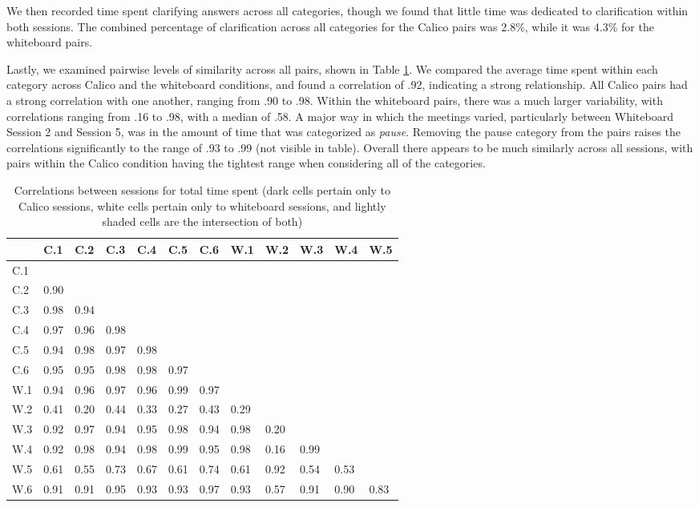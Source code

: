 We then recorded time spent clarifying answers across all categories, though we found that little time was dedicated to clarification within both sessions. The combined percentage of clarification across all categories for the Calico pairs was 2.8\%, while it was 4.3\% for the whiteboard pairs. 

Lastly, we examined pairwise levels of similarity across all pairs, shown in Table \ref{table:3}. We compared the average time spent within each category across Calico and the whiteboard conditions, and found a correlation of .92, indicating a strong relationship. All Calico pairs had a strong correlation with one another, ranging from .90 to .98. Within the whiteboard pairs, there was a much larger variability, with correlations ranging from .16 to .98, with a median of .58. A major way in which the meetings varied, particularly between Whiteboard Session 2 and Session 5, was in the amount of time that was categorized as \emph{pause}. Removing the pause category from the pairs raises the correlations significantly to the range of .93 to .99 (not visible in table). Overall there appears to be much similarly across all sessions, with pairs within the Calico condition having the tightest range when considering all of the categories.

\begin{table}
\centering
\caption{Correlations between sessions for total time spent (dark cells pertain only to Calico sessions, white cells pertain only to whiteboard sessions, and lightly shaded cells are the intersection of both)}
\begin{tabular}{ p{0.5cm}p{0.5cm}p{0.5cm}p{0.5cm}p{0.5cm}p{0.5cm}p{0.5cm}p{0.5cm}p{0.5cm}p{0.5cm}p{0.5cm}p{0.5cm}}
\toprule
&	C.1 &	C.2 &	C.3 &	C.4 &	C.5 &	C.6 &	W.1 &	W.2 &	W.3 &	W.4 &	W.5 \\
\midrule
C.1 	 & & & & & & & & & & & 								 \\		
C.2  &	0.90 & & & & & & & & & & 								 \\		
C.3 & 	0.98 &	0.94 & & & & & & & & & 							 \\		
C.4 & 	0.97 &	0.96 &	0.98 & & & & & & & & 						 \\		
C.5 & 	0.94 &	0.98 &	0.97 &	0.98 & & & & & & & 						 \\	
C.6 & 	0.95 &	0.95 &	0.98 &	0.98 &	0.97 & & & & & & 					 \\	
W.1 &	0.94 &	0.96 &	0.97 &	0.96 &	0.99 &	0.97 & & & & & 				 \\	
W.2 &	0.41 &	0.20 &	0.44 &	0.33 &	0.27 &	0.43 &	0.29 & & & & 			 \\	
W.3 &	0.92 &	0.97 &	0.94 &	0.95 &	0.98 &	0.94 &	0.98 &	0.20 & & & 			 \\
W.4 &	0.92 &	0.98 &	0.94 &	0.98 &	0.99 &	0.95 &	0.98 &	0.16 &	0.99 & & 		 \\
W.5 &	0.61 &	0.55 &	0.73 &	0.67 &	0.61 &	0.74 &	0.61 &	0.92 &	0.54 &	0.53 & 	 \\
W.6 &	0.91 &	0.91 &	0.95 &	0.93 &	0.93 &	0.97 &	0.93 &	0.57 &	0.91 &	0.90 &	0.83 	\\
\bottomrule
\end{tabular}
\label{table:3}
\end{table}

